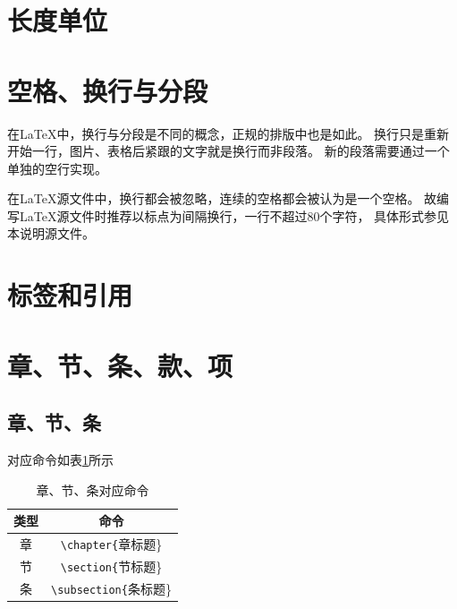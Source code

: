 \section{长度单位}
\label{sec-length}

\section{空格、换行与分段}
\label{sec-linkbreak-par}

在\LaTeX{}中，换行与分段是不同的概念，正规的排版中也是如此。
换行只是重新开始一行，图片、表格后紧跟的文字就是换行而非段落。
新的段落需要通过一个单独的空行实现。

在\LaTeX{}源文件中，换行都会被忽略，连续的空格都会被认为是一个空格。
故编写\LaTeX{}源文件时推荐以标点为间隔换行，一行不超过80个字符，
具体形式参见本说明源文件。

\section{标签和引用}
\label{sec-label-ref}

\section{章、节、条、款、项}
\label{sec-title}

\subsection{章、节、条}
\label{subsec-chap-etc}
对应命令如表\ref{tab-chap-etc-command}所示
\begin{table}
    \centering
    \caption{章、节、条对应命令}
    \label{tab-chap-etc-command}
    \begin{tabular}{c|c}
        \hline
        类型 & 命令 \\ \hline
        章   & \verb|\chapter{|章标题\} \\ \hline
        节   & \verb|\section{|节标题\} \\ \hline
        条   & \verb|\subsection{|条标题\} \\ \hline
    \end{tabular}
\end{table}

